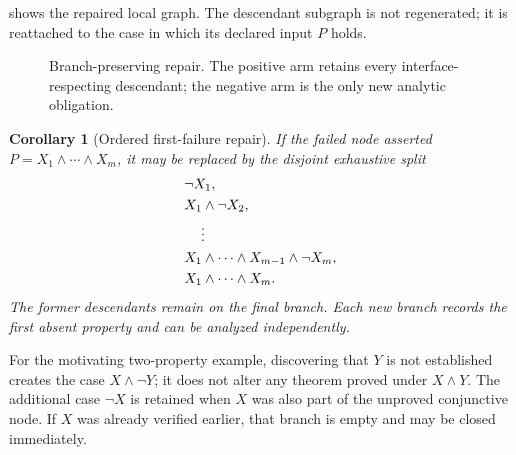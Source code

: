 \documentclass[11pt,reqno]{amsart}
\theoremstyle{plain}
\newtheorem{corollary}[corollary]{Corollary}
\theoremstyle{definition}
\theoremstyle{remark}
\numberwithin{equation}{section}
\begin{document}
 shows the repaired local graph.  The descendant
subgraph is not regenerated; it is reattached to the case in which its declared
input \(P\) holds.

\begin{figure}[H]
\centering
{}
\caption{Branch-preserving repair.  The positive arm retains every
interface-respecting descendant; the negative arm is the only new analytic
obligation.}
\label{fig:branch-repair}
\end{figure}

\begin{corollary}[Ordered first-failure repair]\label{cor:first-failure}
If the failed node asserted
\(P=X_1\wedge\cdots\wedge X_m\), it may be replaced by the disjoint exhaustive
split
\begin{equation}\label{eq:first-failure}
\begin{aligned}
  &\neg X_1,\\
  &X_1\wedge\neg X_2,\\
  &\hspace{1.2em}\vdots\\
  &X_1\wedge\cdots\wedge X_{m-1}\wedge\neg X_m,\\
  &X_1\wedge\cdots\wedge X_m.
\end{aligned}
\end{equation}
The former descendants remain on the final branch.  Each new branch records
the first absent property and can be analyzed independently.
\end{corollary}

For the motivating two-property example, discovering that \(Y\) is not
established creates the case \(X\wedge\neg Y\); it does not alter any theorem
proved under \(X\wedge Y\).  The additional case \(\neg X\) is retained when
\(X\) was also part of the unproved conjunctive node.  If \(X\) was already
verified earlier, that branch is empty and may be closed immediately.
\end{document}
